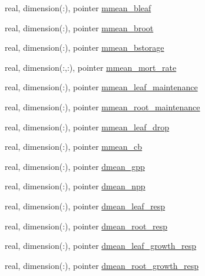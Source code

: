 \begin{DoxyCompactItemize}
\item 
real, dimension(\+:), pointer \hyperlink{structed__state__vars_1_1patchtype_a893324ad3510b5f59780984c2d7b809b}{mmean\+\_\+bleaf}
\item 
real, dimension(\+:), pointer \hyperlink{structed__state__vars_1_1patchtype_a02a3be63d1ae51984b7e06ee7b6233aa}{mmean\+\_\+broot}
\item 
real, dimension(\+:), pointer \hyperlink{structed__state__vars_1_1patchtype_addc7a3549a055ee56f27e654df28793a}{mmean\+\_\+bstorage}
\item 
real, dimension(\+:,\+:), pointer \hyperlink{structed__state__vars_1_1patchtype_ad6f9088d117e132607def307f6298de7}{mmean\+\_\+mort\+\_\+rate}
\item 
real, dimension(\+:), pointer \hyperlink{structed__state__vars_1_1patchtype_acda41b4a3e209cd1d392439e3c53b69b}{mmean\+\_\+leaf\+\_\+maintenance}
\item 
real, dimension(\+:), pointer \hyperlink{structed__state__vars_1_1patchtype_a5ffd4dfb46441684bb4d3bf678ff3ad1}{mmean\+\_\+root\+\_\+maintenance}
\item 
real, dimension(\+:), pointer \hyperlink{structed__state__vars_1_1patchtype_a26647622475a7e03fcd6ad3d4cc5ce06}{mmean\+\_\+leaf\+\_\+drop}
\item 
real, dimension(\+:), pointer \hyperlink{structed__state__vars_1_1patchtype_ae61a45a0d4bcd473f9d6e045a6e550be}{mmean\+\_\+cb}
\item 
real, dimension(\+:), pointer \hyperlink{structed__state__vars_1_1patchtype_a46a46ee01c7acc0737d1a21b37024636}{dmean\+\_\+gpp}
\item 
real, dimension(\+:), pointer \hyperlink{structed__state__vars_1_1patchtype_a6586748e08b04cbf3231780353f67678}{dmean\+\_\+npp}
\item 
real, dimension(\+:), pointer \hyperlink{structed__state__vars_1_1patchtype_ac09bd5336073cbcac66295ae95482e5e}{dmean\+\_\+leaf\+\_\+resp}
\item 
real, dimension(\+:), pointer \hyperlink{structed__state__vars_1_1patchtype_a5768665a5f43a805cb73620ddb3b2096}{dmean\+\_\+root\+\_\+resp}
\item 
real, dimension(\+:), pointer \hyperlink{structed__state__vars_1_1patchtype_a2be9da7be0b463f0c5e2e839a949300d}{dmean\+\_\+leaf\+\_\+growth\+\_\+resp}
\item 
real, dimension(\+:), pointer \hyperlink{structed__state__vars_1_1patchtype_a9ca81327ae7254b1afa8eeb50ee00b4a}{dmean\+\_\+root\+\_\+growth\+\_\+resp}
\item 

\end{DoxyCompactItemize}
